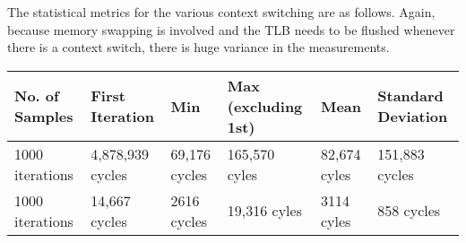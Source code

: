\documentclass[paper=a4, fontsize=11pt]{scrartcl}
\numberwithin{equation}{section}        %
\numberwithin{figure}{section}          %
\numberwithin{table}{section}               %
\begin{document}
The statistical metrics for the various context switching are as follows.  Again, because memory swapping is involved and the TLB needs to be flushed whenever there is a context switch, there is huge variance in the measurements.

\begin{center}
    \begin{tabular}{ | l | l | l | l | l | l |}
    \hline
    No. of Samples & First Iteration & Min & Max (excluding 1st) & Mean & Standard Deviation \\ \hline
    1000 iterations & 4,878,939 cycles & 69,176 cycles & 165,570 cyles & 82,674 cyles & 151,883  cycles \\ 
    1000 iterations & 14,667 cycles & 2616 cycles & 19,316 cyles & 3114 cyles & 858 cycles \\ 
    \hline
    \end{tabular}
\end{center}


\end{document}
